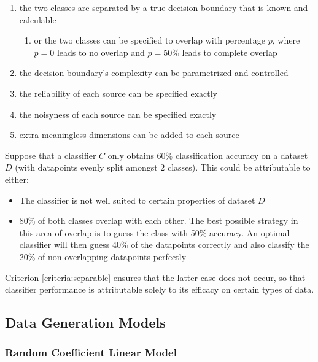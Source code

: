 \documentclass{article}
\begin{document}
\begin{centering}
\begin{enumerate}
    \item \label{criteria:separable} the two classes are separated by a true
        decision boundary that is known and calculable
    \begin{enumerate}
        \item or the two classes can be specified to overlap with percentage
            $p$, where $p=0$ leads to no overlap and $p=50$\% leads to complete
            overlap
    \end{enumerate}
    \item the decision boundary's complexity can be parametrized and controlled
    \item the reliability of each source can be specified exactly
    \item the noisyness of each source can be specified exactly
    \item \label{criteria:noise_dims} extra meaningless dimensions can be added
        to each source
\end{enumerate}
\end{centering}

Suppose that a classifier $C$ only obtains 60\% classification accuracy on a
dataset $D$ (with datapoints evenly split amongst 2 classes). This could be
attributable to either:
\begin{itemize}
    \item The classifier is not well suited to certain properties of dataset $D$
    \item 80\% of both classes overlap with each other. The best possible
        strategy in this area of overlap is to guess the class with 50\%
        accuracy. An optimal classifier will then guess 40\% of the datapoints
        correctly and also classify the 20\% of non-overlapping datapoints
        perfectly
\end{itemize}
Criterion \ref{criteria:separable} ensures that the latter case does not occur,
so that classifier performance is attributable solely to its efficacy on
certain types of data.




\subsection{Data Generation Models}

\subsubsection{Random Coefficient Linear Model}
\end{document}
